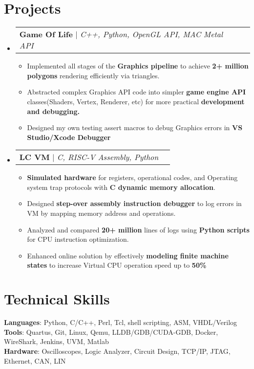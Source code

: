 \documentclass[letterpaper,11pt]{article}
\makeatletter
\newcommand{\resumeItem}[1]{
  \item\small{
    {#1 \vspace{-2pt}}
  }
}
\newcommand{\resumeProjectHeading}[2]{
    \item
    \begin{tabular*}{0.97\textwidth}{l@{\extracolsep{\fill}}r}
      \small#1 & #2 \\
    \end{tabular*}\vspace{-7pt}
}
\newcommand{\resumeSubHeadingListStart}{\begin{itemize}[leftmargin=0.15in, label={}]}
\newcommand{\resumeSubHeadingListEnd}{\end{itemize}}
\newcommand{\resumeItemListStart}{\begin{itemize}}
\newcommand{\resumeItemListEnd}{\end{itemize}\vspace{-5pt}}
\makeatother
\begin{document}
\section{Projects}
    \resumeSubHeadingListStart
      \resumeProjectHeading
      {\textbf{Game Of Life} $|$ \emph{C++, Python, OpenGL API, MAC Metal API }}{}
          \resumeItemListStart
            \resumeItem {Implemented all stages of the \textbf{Graphics pipeline} to achieve \textbf{2+ million polygons} rendering efficiently via triangles.}
            \resumeItem {Abstracted complex Graphics API code into simpler \textbf{game engine API} classes(Shaders, Vertex, Renderer, etc) for more practical \textbf{development and debugging.}}
            \resumeItem {Designed my own testing assert macros to debug Graphics errors in \textbf{VS Studio/Xcode Debugger}}
          \resumeItemListEnd
      \resumeProjectHeading
      {\textbf{LC VM} $|$ \emph{C, RISC-V Assembly, Python}}{}
      \resumeItemListStart
          \resumeItem {\textbf{Simulated hardware} for registers, operational codes, and Operating system trap protocols with \textbf{C dynamic memory allocation}.}
          \resumeItem  { Designed \textbf{step-over assembly instruction debugger} to log errors in VM by mapping memory address and operations.}
          \resumeItem {Analyzed and compared \textbf{20+ million} lines of logs using \textbf{Python scripts} for CPU instruction optimization.}
          \resumeItem {Enhanced online solution by effectively \textbf{modeling finite machine states} to increase Virtual CPU operation speed up to \textbf{50\%}}
      \resumeItemListEnd
    \resumeSubHeadingListEnd
%
\section{Technical Skills}
 \begin{itemize}[leftmargin=0.15in, label={}]
    \small{\item{
     \textbf{Languages}{: Python, C/C++, Perl, Tcl, shell scripting, ASM, VHDL/Verilog} \\
     \textbf{Tools}{: Quartus, Git, Linux, Qemu, LLDB/GDB/CUDA-GDB, Docker, WireShark, Jenkins, UVM, Matlab } \\
     \textbf{Hardware}{: Oscilloscopes, Logic Analyzer, Circuit Design, TCP/IP, JTAG, Ethernet, CAN, LIN } \\
    }}
 \end{itemize}


\end{document}
